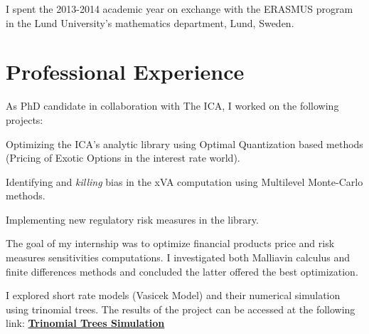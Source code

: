 \documentclass[]{deedy-resume-openfont}
\begin{document}
\begin{minipage}[t]{0.64\textwidth}
I spent the 2013-2014 academic year on exchange with the ERASMUS program in the Lund University's mathematics department, Lund, Sweden.



\vspace{\topsep}
\vspace{\topsep}
\section{Professional Experience}

As PhD candidate in collaboration with The ICA, I worked on the following projects:
\begin{tightemize}
\item Optimizing the ICA's analytic library using Optimal Quantization based methods (Pricing of Exotic Options in the interest rate world).
\item Identifying and \textit{killing} bias in the xVA computation using Multilevel Monte-Carlo methods.
\item Implementing new regulatory risk measures in the library.
\end{tightemize}

\sectionsep

The goal of my internship was to optimize financial products price and risk measures sensitivities computations. I investigated both Malliavin calculus and finite differences methods and concluded the latter offered the best optimization.
\sectionsep

I explored short rate models (Vasicek Model) and their numerical simulation using trinomial trees. The results of the project can be accessed at the following link: \href{http://simulations.lpsm.paris/trinomial_trees/}{\bf Trinomial Trees Simulation}
\sectionsep

\end{minipage}
\end{document}

